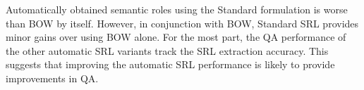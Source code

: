 Automatically obtained semantic roles using the Standard formulation is worse than BOW by itself. 
However, in conjunction with BOW, Standard SRL provides minor gains over using BOW alone. 
For the most part, the QA performance of the other automatic SRL variants track the SRL extraction accuracy. 
This suggests that improving the automatic SRL performance is likely to provide improvements in QA. 


